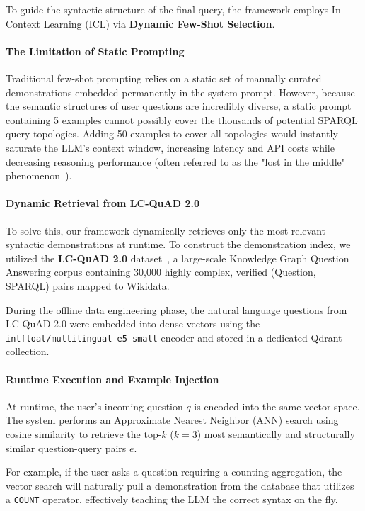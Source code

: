 To guide the syntactic structure of the final query, the framework employs In-Context Learning (ICL) via \textbf{Dynamic Few-Shot Selection}. 

\paragraph{The Limitation of Static Prompting}
Traditional few-shot prompting relies on a static set of manually curated demonstrations embedded permanently in the system prompt. However, because the semantic structures of user questions are incredibly diverse, a static prompt containing 5 examples cannot possibly cover the thousands of potential SPARQL query topologies. Adding 50 examples to cover all topologies would instantly saturate the LLM's context window, increasing latency and API costs while decreasing reasoning performance (often referred to as the "lost in the middle" phenomenon~\cite{liu2024lost}).

\paragraph{Dynamic Retrieval from LC-QuAD 2.0}
To solve this, our framework dynamically retrieves only the most relevant syntactic demonstrations at runtime. To construct the demonstration index, we utilized the \textbf{LC-QuAD 2.0} dataset~\cite{dubey2019lcquad}, a large-scale Knowledge Graph Question Answering corpus containing 30,000 highly complex, verified (Question, SPARQL) pairs mapped to Wikidata.

During the offline data engineering phase, the natural language questions from LC-QuAD 2.0 were embedded into dense vectors using the \texttt{intfloat/multilingual-e5-small} encoder and stored in a dedicated Qdrant collection. 

\paragraph{Runtime Execution and Example Injection}
At runtime, the user's incoming question $q$ is encoded into the same vector space. The system performs an Approximate Nearest Neighbor (ANN) search using cosine similarity to retrieve the top-$k$ ($k=3$) most semantically and structurally similar question-query pairs $e$.

For example, if the user asks a question requiring a counting aggregation, the vector search will naturally pull a demonstration from the database that utilizes a \texttt{COUNT} operator, effectively teaching the LLM the correct syntax on the fly.

